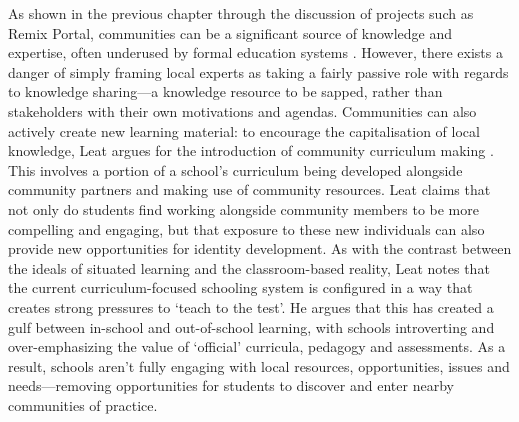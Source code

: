 As shown in the previous chapter through the discussion of projects such as Remix Portal, communities can be a significant source of knowledge and expertise, often underused by formal education systems \citep{Dodds2017}. However, there exists a danger of simply framing local experts as taking a fairly passive role with regards to knowledge sharing---a knowledge resource to be sapped, rather than stakeholders with their own motivations and agendas. Communities can also actively create new learning material: to encourage the capitalisation of local knowledge, Leat argues for the introduction of community curriculum making \citep{Leat2015}. This involves a portion of a school's curriculum being developed alongside community partners and making use of community resources. Leat claims that not only do students find working alongside community members to be more compelling and engaging, but that exposure to these new individuals can also provide new opportunities for identity development. As with the contrast between the ideals of situated learning and the classroom-based reality, Leat notes that the current curriculum-focused schooling system is configured in a way that creates strong pressures to `teach to the test'. He argues that this has created a gulf between in-school and out-of-school learning, with schools introverting and over-emphasizing the value of `official' curricula, pedagogy and assessments. As a result, schools aren't fully engaging with local resources, opportunities, issues and needs---removing opportunities for students to discover and enter nearby communities of practice.

